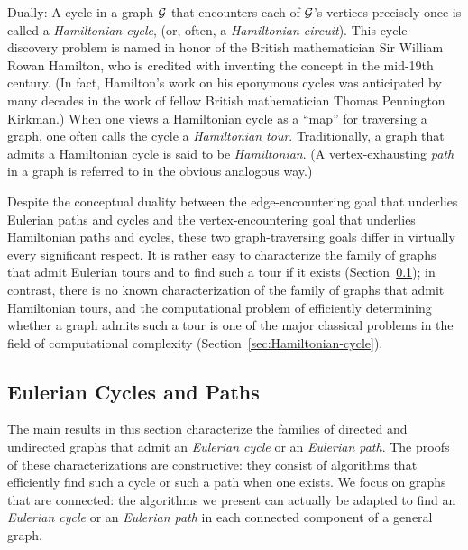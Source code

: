  
 
 
Dually: A cycle in a graph $\mbox{$\cal G$}$ that encounters each of $\mbox{$\cal G$}$'s vertices
precisely once is called a {\it Hamiltonian cycle}, (or, often, a {\it Hamiltonian circuit}).  
This cycle-discovery problem is named in honor of the British mathematician 
Sir William Rowan Hamilton, who is credited with inventing the
concept in the mid-19th century.  (In fact, Hamilton's work on his eponymous cycles
was anticipated by many decades in the work of fellow British mathematician 
Thomas Pennington Kirkman.)  When one views a Hamiltonian cycle as a ``map'' for 
traversing a graph, one often calls the cycle a {\it Hamiltonian tour}.  Traditionally, a graph
that admits a Hamiltonian cycle is said to be {\it Hamiltonian}.  (A vertex-exhausting {\em path} 
in a graph is referred to in the obvious analogous way.)  
  

\medskip

Despite the conceptual duality between the edge-encountering goal that
underlies Eulerian paths and cycles and the
vertex-encountering goal that underlies Hamiltonian paths and cycles,
these two graph-traversing goals differ in virtually every significant
respect.  It is rather easy to characterize the family of graphs that
admit Eulerian tours and to find such a tour if it exists
(Section~\ref{sec:EulerianCycle}); in contrast, there is no known
characterization of the family of graphs that admit Hamiltonian tours,
and the computational problem of efficiently determining whether a
graph admits such a tour is one of the major classical problems in the
field of computational complexity  (Section~\ref{sec:Hamiltonian-cycle}).


\subsection{Eulerian Cycles and Paths}
\label{sec:EulerianCycle}

The main results in this section characterize the families of directed
and undirected graphs that admit an {\it Eulerian cycle} or an {\it
  Eulerian path}.  The proofs of these characterizations are
constructive: they consist of algorithms that efficiently find such a
cycle or such a path when one exists.  We focus on graphs that are
connected: the algorithms we present can actually be adapted to find
an {\it Eulerian cycle} or an {\it Eulerian path} in each connected
component of a general graph.

